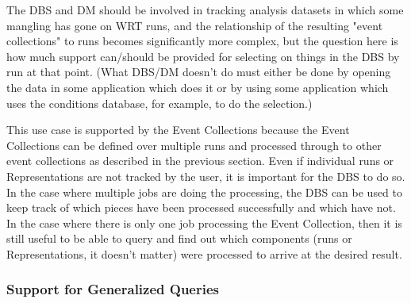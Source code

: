 \documentclass{cmspaper}
\begin{document}
The DBS and DM should be involved in tracking analysis datasets in which
some mangling has gone on WRT runs, and the relationship of the resulting 
"event collections" to runs becomes significantly more complex, but the 
question here is how much support can/should be provided for selecting on 
things in the DBS by run at that point. (What DBS/DM doesn't do must either 
be done by opening the data in some application which does it or by using 
some application which uses the conditions database, for example, to do the
selection.)

This use case is supported by the Event Collections because the Event Collections 
can be defined over multiple runs and processed through to other event collections
as described in the previous section.  Even if individual runs or Representations 
are not tracked by the user, it is important for the DBS to do so.  In the case 
where multiple jobs are doing the processing, the DBS can be used to keep track of
which pieces have been processed successfully and which have not.  In the case
where there is only one job processing the Event Collection, then it is still 
useful to be able to query and find out which components 
(runs or Representations, it doesn't matter) were processed to 
arrive at the desired result.




\subsubsection{Support for Generalized Queries}

\end{document}
